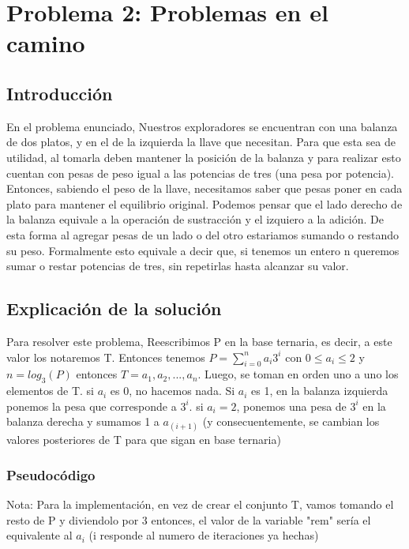 \documentclass[spanish,12pt]{article}
\begin{document}
 

\section{Problema 2: Problemas en el camino}

\subsection{Introducción}

En el problema enunciado, Nuestros exploradores se encuentran con una balanza de dos platos, y en el de la izquierda la llave que necesitan. Para que esta sea de utilidad, al tomarla deben mantener la posición de la balanza y para realizar esto cuentan con pesas de peso igual a las potencias de tres (una pesa por potencia).
Entonces, sabiendo el peso de la llave, necesitamos saber que pesas poner en cada plato para mantener el equilibrio original.
Podemos pensar que el lado derecho de la balanza equivale a la operación de sustracción y el izquiero a la adición. De esta forma al agregar pesas de un lado o del otro estariamos sumando o restando su peso.
Formalmente esto equivale a decir que, si tenemos un entero n queremos sumar o restar potencias de tres, sin repetirlas hasta alcanzar su valor.

\subsection{Explicación de la solución}

Para resolver este problema, Reescribimos P en la base ternaria, es decir, a este valor los notaremos T. Entonces tenemos $P = \sum_{i=0}^{n} a_i3^i$  con $0 \leq a_i \leq 2$ y $n = log_{3}{(P)}$  entonces $T ={a_1,a_2,...,a_n}$.
Luego, se toman en orden uno a uno los elementos de T. si $a_i$ es 0, no hacemos nada. Si $a_i$ es 1, en la balanza izquierda ponemos la pesa que corresponde a $3^i$. si $a_i =2$, ponemos una pesa de $3^i$ en la balanza derecha y sumamos 1 a $a_{(i+1)}$ (y consecuentemente, se cambian los valores posteriores de T para que sigan en base ternaria)


\subsubsection{Pseudocódigo}

Nota: Para la implementación, en vez de crear el conjunto T, vamos tomando el resto de P y diviendolo por 3 entonces, el valor de la variable "rem" sería el equivalente al $a_i$ (i responde al numero de iteraciones ya hechas)
\end{document}
